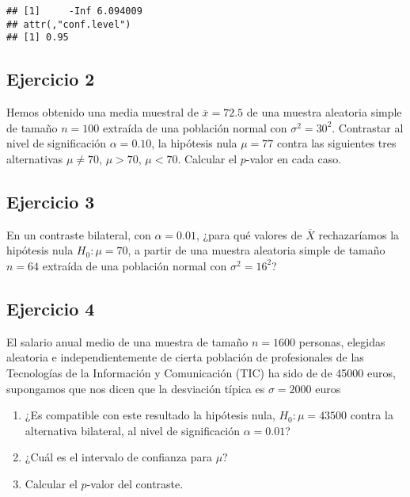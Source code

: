\documentclass[
]{article}
\providecommand{\tightlist}{%
  \setlength{\itemsep}{0pt}\setlength{\parskip}{0pt}}
\begin{document}
\begin{verbatim}
## [1]     -Inf 6.094009
## attr(,"conf.level")
## [1] 0.95
\end{verbatim}

\hypertarget{ejercicio-2}{%
\subsection{Ejercicio 2}\label{ejercicio-2}}

Hemos obtenido una media muestral de \(\overline{x}=72.5\) de una
muestra aleatoria simple de tamaño \(n=100\) extraída de una población
normal con \(\sigma^2=30^2\). Contrastar al nivel de significación
\(\alpha=0.10\), la hipótesis nula \(\mu=77\) contra las siguientes tres
alternativas \(\mu\not= 70\), \(\mu>70\), \(\mu<70\). Calcular el
\(p\)-valor en cada caso.

\hypertarget{ejercicio-3}{%
\subsection{Ejercicio 3}\label{ejercicio-3}}

En un contraste bilateral, con \(\alpha=0.01\), ¿para qué valores de
\(\overline{X}\) rechazaríamos la hipótesis nula \(H_{0}:\mu=70\), a
partir de una muestra aleatoria simple de tamaño \(n=64\) extraída de
una población normal con \(\sigma^2=16^2\)?

\hypertarget{ejercicio-4}{%
\subsection{Ejercicio 4}\label{ejercicio-4}}

El salario anual medio de una muestra de tamaño \(n= 1600\) personas,
elegidas aleatoria e independientemente de cierta población de
profesionales de las Tecnologías de la Información y Comunicación (TIC)
ha sido de de 45000 euros, supongamos que nos dicen que la desviación
típica es \(\sigma=2000\) euros

\begin{enumerate}
\def\labelenumi{\arabic{enumi}.}
\tightlist
\item
  ¿Es compatible con este resultado la hipótesis nula,
  \(H_{0}:\mu=43500\) contra la alternativa bilateral, al nivel de
  significación \(\alpha=0.01\)?
\item
  ¿Cuál es el intervalo de confianza para \(\mu\)?
\item
  Calcular el \(p\)-valor del contraste.
\end{enumerate}
\end{document}
